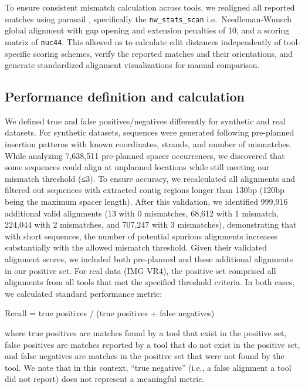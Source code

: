 \documentclass[
]{article}
\begin{document}
To ensure consistent mismatch calculation across tools, we realigned all
reported matches using parasail \autocite{Daily2016_parasail},
specifically the \texttt{nw\_stats\_scan} i.e.~Needleman-Wunsch global
alignment with gap opening and extension penalties of 10, and a scoring
matrix of \texttt{nuc44}. This allowed us to calculate edit distances
independently of tool-specific scoring schemes, verify the reported
matches and their orientations, and generate standardized alignment
visualizations for manual comparison.

\subsection{Performance definition and
calculation}\label{sec-performance-calc}

We defined true and false positives/negatives differently for synthetic
and real datasets. For synthetic datasets, sequences were generated
following pre-planned insertion patterns with known coordinates,
strands, and number of mismatches. While analyzing 7,638,511 pre-planned
spacer occurrences, we discovered that some sequences could align at
unplanned locations while still meeting our mismatch threshold (≤3). To
ensure accuracy, we recalculated all alignments and filtered out
sequences with extracted contig regions longer than 130bp (120bp being
the maximum spacer length). After this validation, we identified 999,916
additional valid alignments (13 with 0 mismatches, 68,612 with 1
mismatch, 224,044 with 2 mismatches, and 707,247 with 3 mismatches),
demonstrating that with short sequences, the number of potential
spurious alignments increases substantially with the allowed mismatch
threshold. Given their validated alignment scores, we included both
pre-planned and these additional alignments in our positive set. For
real data (IMG VR4), the positive set comprised all alignments from all
tools that met the specified threshold criteria. In both cases, we
calculated standard performance metric:

Recall = true positives / (true positives + false negatives)

where true positives are matches found by a tool that exist in the
positive set, false positives are matches reported by a tool that do not
exist in the positive set, and false negatives are matches in the
positive set that were not found by the tool. We note that in this
context, ``true negative'' (i.e., a false alignment a tool did not
report) does not represent a meaningful metric.
\end{document}
